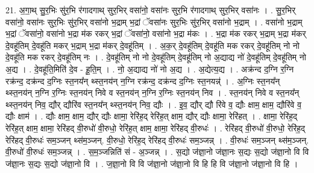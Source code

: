 \documentclass[17pt]{extarticle}
\begin{document}
21. अ॒गा॒थ् सु॒र॒भिः सु॑र॒भि र॑गादगाथ् सुर॒भिर् वसा॑नो॒ वसा॑नः सुर॒भि र॑गादगाथ् सुर॒भिर् वसा॑नः । . सु॒र॒भिर् वसा॑नो॒ वसा॑नः सुर॒भिः सु॑र॒भिर् वसा॑नो भ॒द्राम् भ॒द्रां ॅवसा॑नः सुर॒भिः सु॑र॒भिर् वसा॑नो भ॒द्राम् । . वसा॑नो भ॒द्राम् भ॒द्रां ॅवसा॑नो॒ वसा॑नो भ॒द्रा म॑क रकर् भ॒द्रां ॅवसा॑नो॒ वसा॑नो भ॒द्रा म॑कः । . भ॒द्रा म॑क रकर् भ॒द्राम् भ॒द्रा म॑कर् दे॒वहू॑तिम् दे॒वहू॑ति मकर् भ॒द्राम् भ॒द्रा म॑कर् दे॒वहू॑तिम् । . अ॒क॒र् दे॒वहू॑तिम् दे॒वहू॑ति मक रकर् दे॒वहू॑तिम् नो नो दे॒वहू॑ति मक रकर् दे॒वहू॑तिम् नः । . दे॒वहू॑तिम् नो नो दे॒वहू॑तिम् दे॒वहू॑तिम् नो अ॒द्याद्य नो॑ दे॒वहू॑तिम् दे॒वहू॑तिम् नो अ॒द्य । . दे॒वहू॑ति॒मिति॑ दे॒व - हू॒ति॒म् । . नो॒ अ॒द्याद्य नो॑ नो अ॒द्य । . अ॒द्येत्य॒द्य । . अक्र॑न्द द॒ग्नि र॒ग्नि रक्र॑न्द॒ दक्र॑न्द द॒ग्निः स्त॒नय᳚न् थ्स्त॒नय॑न् न॒ग्नि रक्र॑न्द॒ दक्र॑न्द द॒ग्निः स्त॒नयन्न्॑ । . अ॒ग्निः स्त॒नय᳚न् थ्स्त॒नय॑न् न॒ग्नि र॒ग्निः स्त॒नय॑न् निवे व स्त॒नय॑न् न॒ग्नि र॒ग्निः स्त॒नय॑न् निव । . स्त॒नय॑न् निवे व स्त॒नय᳚न् थ्स्त॒नय॑न् निव॒ द्यौर् द्यौरि॑व स्त॒नय᳚न् थ्स्त॒नय॑न् निव॒ द्यौः । . इ॒व॒ द्यौर् द्यौ रि॑वे व॒ द्यौः क्षाम॒ क्षाम॒ द्यौरि॑वे व॒ द्यौः क्षाम॑ । . द्यौः क्षाम॒ क्षाम॒ द्यौर् द्यौः क्षामा॒ रेरि॑ह॒द् रेरि॑ह॒त् क्षाम॒ द्यौर् द्यौः क्षामा॒ रेरि॑हत् । . क्षामा॒ रेरि॑ह॒द् रेरि॑ह॒त् क्षाम॒ क्षामा॒ रेरि॑हद् वी॒रुधो॑ वी॒रुधो॒ रेरि॑ह॒त् क्षाम॒ क्षामा॒ रेरि॑हद् वी॒रुधः॑ । . रेरि॑हद् वी॒रुधो॑ वी॒रुधो॒ रेरि॑ह॒द् रेरि॑हद् वी॒रुधः॑ सम॒ञ्जन् थ्स॑म॒ञ्जन्. वी॒रुधो॒ रेरि॑ह॒द् रेरि॑हद् वी॒रुधः॑ सम॒ञ्जन्न् । . वी॒रुधः॑ सम॒ञ्जन् थ्स॑म॒ञ्जन्. वी॒रुधो॑ वी॒रुधः॑ सम॒ञ्जन्न् । . स॒म॒ञ्जन्निति॑ सं - अ॒ञ्जन्न् । . स॒द्यो ज॑ज्ञा॒नो ज॑ज्ञा॒नः स॒द्यः स॒द्यो ज॑ज्ञा॒नो वि वि ज॑ज्ञा॒नः स॒द्यः स॒द्यो ज॑ज्ञा॒नो वि । . ज॒ज्ञा॒नो वि वि ज॑ज्ञा॒नो ज॑ज्ञा॒नो वि हि हि वि ज॑ज्ञा॒नो ज॑ज्ञा॒नो वि हि । \newline
\end{document}
